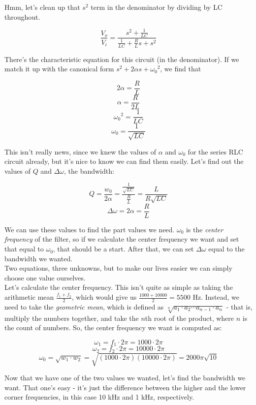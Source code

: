 \documentclass[12pt,a4paper]{report}
\begin{document}
Hmm, let's clean up that $s^2$ term in the denominator by dividing by LC throughout.

\[ \frac{V_o}{V_i} = \frac{s^2 + \frac{1}{LC}}{\frac{1}{LC} + \frac{R}{L} s + s^2} \]

There's the characteristic equation for this circuit (in the denominator). If we match it up with the canonical form $s^2 + 2\alpha s + {\omega_0}^2$, we find that

\[ 2\alpha = \frac{R}{L} \]
\[ \alpha = \frac{R}{2L} \]
\[ {\omega_0}^2 = \frac{1}{LC} \]
\[ \omega_0 = \frac{1}{\sqrt{LC}} \]

This isn't really news, since we knew the values of $\alpha$ and $\omega_0$ for the series RLC circuit already, but it's nice to know we can find them easily. Let's find out the values of $Q$ and $\Delta \omega$, the bandwidth:

\[ Q = \frac{w_0}{2\alpha} = \frac{ \frac{1}{\sqrt{LC}} }{ \frac{R}{L} } = \frac{L}{R\sqrt{LC}} \]
\[ \Delta\omega = 2 \alpha = \frac{R}{L} \]

We can use these values to find the part values we need. $\omega_0$ is the \emph{center frequency} of the filter, so if we calculate the center frequency we want and set that equal to $\omega_0$, that should be a start. After that, we can set $\Delta \omega$ equal to the bandwidth we wanted.\\
Two equations, three unknowns, but to make our lives easier we can simply choose one value ourselves.\\

Let's calculate the center frequency. This isn't quite as simple as taking the arithmetic mean $\displaystyle \frac{f_1 + f_2}{2}$, which would give us $\displaystyle \frac{1000 + 10000}{2} = 5500$ Hz. Instead, we need to take the \emph{geometric mean}, which is defined as $\sqrt[n]{a_1 \cdot a_2 \cdots a_{n-1} \cdot a_{n}}$ - that is, multiply the numbers together, and take the $n$th root of the product, where $n$ is the count of numbers. So, the center frequency we want is computed as:

\[ \omega_1 = f_1 \cdot 2\pi = 1000 \cdot 2 \pi \]
\[ \omega_2 = f_2 \cdot 2\pi = 10000 \cdot 2 \pi \]
\[ \omega_0 = \sqrt{w_1 \cdot w_2} = \sqrt{(1000 \cdot 2\pi)(10000 \cdot 2\pi)} = 2000 \pi \sqrt{10} \]

Now that we have one of the two values we wanted, let's find the bandwidth we want. That one's easy - it's just the difference between the higher and the lower corner frequencies, in this case 10 kHz and 1 kHz, respectively.
\end{document}
